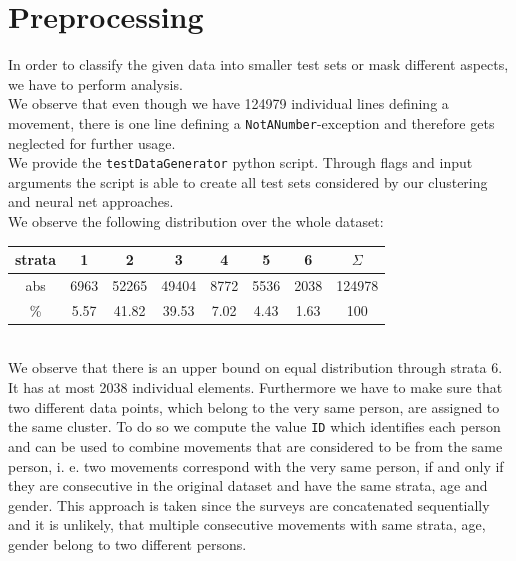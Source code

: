 \documentclass[runningheads]{llncs}
\begin{document}
	\section{Preprocessing}\label{sec: proprocessing}
	In order to classify the given data into smaller test sets or mask different aspects, we have to perform analysis.\\
	We observe that even though we have 124979 individual lines defining a movement, there is one line defining a \texttt{NotANumber}-exception and therefore gets neglected for further usage.	\\
	We provide the \texttt{testDataGenerator} python script. Through flags and input arguments the script is able to create all test sets considered by our clustering and neural net approaches.\\
	We observe the following distribution over the whole dataset:\\
	{\hspace*{2cm}\setlength\tabcolsep{.2cm}\begin{tabular}{c|ccccccc}
		strata &  1   &   2   &   3   &  4   &  5   &  6   & $\Sigma$ \\ \hline
		 abs   & 6963 & 52265 & 49404 & 8772 & 5536 & 2038 &  124978  \\
		  \%   & 5.57 & 41.82 & 39.53 & 7.02 & 4.43 & 1.63 &   100
	\end{tabular}}\\
	We observe that there is an upper bound on equal distribution through strata 6. It has at most 2038 individual elements.
	Furthermore we have to make sure that  two different data points, which belong to the very same person, are assigned to the same cluster. To do so we compute the value \texttt{ID} which identifies each person and can be used to combine movements that are considered to be from the same person, i. e. two movements correspond with the very same person, if and only if they are consecutive in the original dataset and have the same strata, age and gender. This approach is taken since the surveys are concatenated sequentially and it is unlikely, that multiple consecutive movements with same strata, age, gender belong to two different persons.
	
\end{document}
